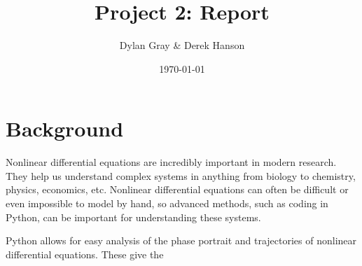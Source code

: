 \documentclass[11pt]{article}
\title{Project 2: Report}
\author{Dylan Gray \& Derek Hanson}
\date{\today}
\begin{document}
\sloppy
\maketitle

\section{Background}
Nonlinear differential equations are incredibly important in modern research.  They help us understand complex systems in anything from biology to chemistry, physics, economics, etc.  Nonlinear differential equations can often be difficult or even impossible to model by hand, so advanced methods, such as coding in Python, can be important for understanding these systems. \newline

\noindent Python allows for easy analysis of the phase portrait and trajectories of nonlinear differential equations.  These give the 
\end{document}
